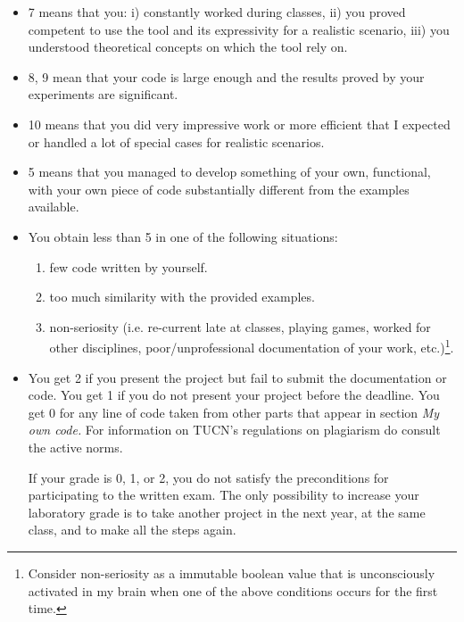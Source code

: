 \begin{itemize}

\item 7 means that you: 
i) constantly worked during classes, 
 ii) you proved competent to use the tool and its expressivity for a realistic scenario, 
iii) you understood theoretical concepts on which the tool rely on.

\item 8, 9 mean that your code is large enough and the results proved by your experiments are significant.

 \item 10 means that you did very impressive work or more efficient 
that I expected or handled a lot of special cases for realistic scenarios.


\item 5 means that you managed to develop something of your own, functional, 
with your own piece of code substantially different from the examples available.

\item You obtain less than 5 in one of the following situations: 

\begin{enumerate}
\item few code written by yourself.
\item too much similarity with the provided examples.
\item non-seriosity (i.e. re-current late at classes, playing games, worked for other disciplines, 
poor/unprofessional documentation of your work, etc.)\footnote{Consider non-seriosity as a immutable boolean value that 
is unconsciously activated in my brain when one of the above conditions occurs for the first time.}.
\end{enumerate}

\item You get 2 if you present the project but fail to submit the documentation or code.
You get 1 if you do not present your project before the deadline.
You get 0 for any line of code taken from other parts that appear in section {\it My own code.} 
For information on TUCN's regulations on plagiarism do consult the active norms.

If your grade is 0, 1, or 2, you do not satisfy 
the preconditions for participating to the written exam. 
The only possibility to increase your laboratory grade is to take another project in the next year, 
at the same class, and to make all the steps again.   
\end{itemize}

